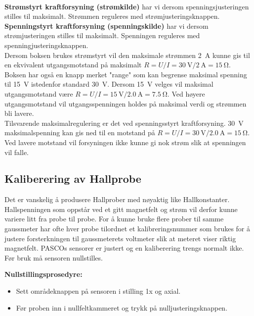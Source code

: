 \documentclass[../Elmag-labhefte-2020.tex]{subfiles}
\begin{document}
\begin{itemize}
    \\[1mm]
    \textbf{Strømstyrt kraftforsyning (strømkilde)} har vi dersom spenningsjusteringen stilles til maksimalt. Strømmen reguleres med strømjusteringsknappen. 
    \\[1mm]
    \textbf{Spenningstyrt kraftforsyning (spenningskilde)} har vi dersom strømjusteringen stilles til maksimalt. Spenningen reguleres med spenningjusteringsknappen. 
    \\[1mm]
    Dersom boksen brukes strømstyrt vil den maksimale strømmen \SI{2}{\ampere} kunne gis til en ekvivalent utgangsmotstand på maksimalt $R = U/I = \SI{30}{\volt} / \SI{2}{\ampere} = \SI{15}{\ohm}$. Boksen har også en knapp merket "range" som kan begrense maksimal spenning til \SI{15}{\volt} istedenfor standard \SI{30}{\volt}. Dersom \SI{15}{\volt} velges vil maksimal utgangsmotstand være $R = U/I = \SI{15}{\volt} / \SI{2,0}{\ampere} = \SI{7,5}{\ohm}$. Ved høyere utgangsmotstand vil utgangsspenningen holdes på maksimal verdi og strømmen bli lavere.
    \\[1mm]
    Tilsvarende maksimalregulering er det ved spenningsstyrt kraftforsyning. \SI{30}{\volt} maksimalspenning kan gis ned til en motstand på $R = U/I = \SI{30}{\volt} / \SI{2,0}{\ampere} = \SI{15}{\ohm}$. Ved lavere motstand vil forsyningen ikke kunne gi nok strøm slik at spenningen vil falle.
\end{itemize}

\subsection{Kaliberering av Hallprobe}

Det er vanskelig å produsere Hallprober med nøyaktig like Hallkonstanter. Hallspenningen som oppstår ved et gitt magnetfelt og strøm vil derfor kunne variere litt fra probe til probe. For å kunne bruke flere prober til samme gaussmeter har ofte hver probe tilordnet et kalibreringsnummer som brukes for å justere forsterkningen til gaussmeterets voltmeter slik at meteret viser riktig magnetfelt. PASCOs sensorer er justert og en kaliberering trengs normalt ikke. Før bruk må sensoren nullstilles. 

\textbf{Nullstillingsprosedyre:}
\vspace{-5mm}
\begin{itemize}
    \item Sett områdeknappen på sensoren i stilling 1x og axial.
    \item Før proben inn i nullfeltkammeret og trykk på nulljusteringsknappen.
\end{itemize}
\end{document}
